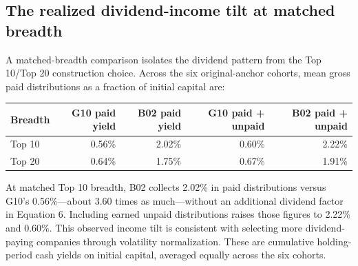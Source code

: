 \subsection{The realized dividend-income tilt at matched breadth}

A matched-breadth comparison isolates the dividend pattern from the
Top 10/Top 20 construction choice. Across the six original-anchor cohorts,
mean gross paid distributions as a fraction of initial capital are:

\begin{minipage}{\linewidth}
\begin{center}\small\setlength{\tabcolsep}{4pt}\renewcommand{\arraystretch}{1.18}
\begin{longtable}{@{}lrrrr@{}}\toprule
Breadth & G10 paid yield & B02 paid yield & G10 paid + unpaid & B02 paid + unpaid\\\midrule\endhead
Top 10 & 0.56\% & 2.02\% & 0.60\% & 2.22\%\\
Top 20 & 0.64\% & 1.75\% & 0.67\% & 1.91\%\\
\bottomrule\end{longtable}\end{center}
\end{minipage}\par

At matched Top 10 breadth, B02 collects 2.02\% in paid distributions
versus G10's 0.56\%---about 3.60 times as much---without an additional
dividend factor in Equation 6. Including earned unpaid distributions
raises those figures to 2.22\% and 0.60\%. This observed income tilt
is consistent with selecting more dividend-paying companies through
volatility normalization. These are cumulative holding-period cash yields
on initial capital, averaged equally across the six cohorts.
